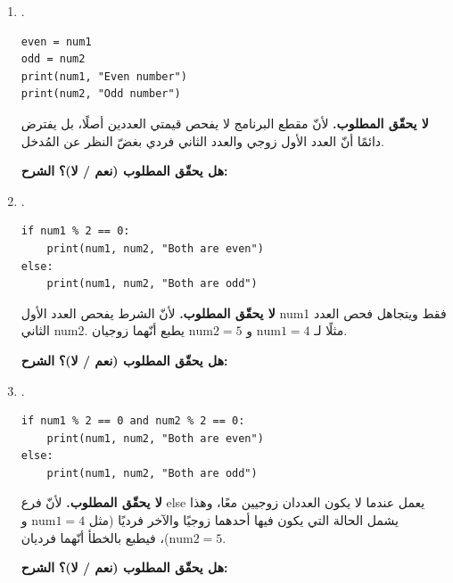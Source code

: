 \documentclass[14pt]{extarticle}
\begin{document}
\begin{enumerate}[label=\textbf{تمرين \arabic*:}, wide=0pt, itemsep=2.2em]
\begin{enumerate}[label=\alph*., itemsep=1.5em]
\item .
\begin{boxCode}
\begin{english}
\begin{verbatim}
even = num1
odd = num2
print(num1, "Even number")
print(num2, "Odd number")
\end{verbatim}
\end{english}
\end{boxCode}
\ifwithsols
\begin{boxSolution}
\textbf{لا يحقّق المطلوب.} لأنّ مقطع البرنامج لا يفحص قيمتي العددين أصلًا، بل يفترض دائمًا أنّ العدد الأول زوجي والعدد الثاني فردي بغضّ النظر عن المُدخل.
\end{boxSolution}
\else
\textbf{هل يحقّق المطلوب (نعم / لا)؟} \underline{\hspace{3cm}} \quad \textbf{الشرح:} \underline{\hspace{7cm}}
\fi
\filbreak

\item .
\begin{boxCode}
\begin{english}
\begin{verbatim}
if num1 % 2 == 0:
    print(num1, num2, "Both are even")
else:
    print(num1, num2, "Both are odd")
\end{verbatim}
\end{english}
\end{boxCode}
\ifwithsols
\begin{boxSolution}
\textbf{لا يحقّق المطلوب.} لأنّ الشرط يفحص العدد الأول \textenglish{num1} فقط ويتجاهل فحص العدد الثاني \textenglish{num2}. مثلًا لـ $\text{num1} = 4$ و $\text{num2} = 5$ يطبع أنّهما زوجيان.
\end{boxSolution}
\else
\textbf{هل يحقّق المطلوب (نعم / لا)؟} \underline{\hspace{3cm}} \quad \textbf{الشرح:} \underline{\hspace{7cm}}
\fi
\filbreak

\item .
\begin{boxCode}
\begin{english}
\begin{verbatim}
if num1 % 2 == 0 and num2 % 2 == 0:
    print(num1, num2, "Both are even")
else:
    print(num1, num2, "Both are odd")
\end{verbatim}
\end{english}
\end{boxCode}
\ifwithsols
\begin{boxSolution}
\textbf{لا يحقّق المطلوب.} لأنّ فرع \textenglish{else} يعمل عندما لا يكون العددان زوجيين معًا، وهذا يشمل الحالة التي يكون فيها أحدهما زوجيًا والآخر فرديًا (مثل $\text{num1} = 4$ و $\text{num2} = 5$)، فيطبع بالخطأ أنّهما فرديان.
\end{boxSolution}
\else
\textbf{هل يحقّق المطلوب (نعم / لا)؟} \underline{\hspace{3cm}} \quad \textbf{الشرح:} \underline{\hspace{7cm}}
\fi
\filbreak


\end{enumerate}
\end{enumerate}
\end{document}
